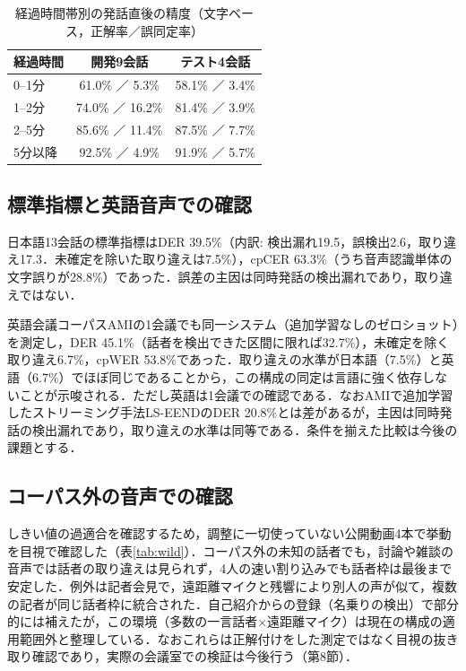 \documentclass[a4paper]{ltjsarticle}
\begin{document}
\begin{table}[tb]
\centering
\caption{経過時間帯別の発話直後の精度（文字ベース，正解率／誤同定率）}
\label{tab:band}
\small
\begin{tabular}{lcc}
\toprule
経過時間 & 開発9会話 & テスト4会話 \\
\midrule
0--1分 & 61.0\% ／ 5.3\% & 58.1\% ／ 3.4\% \\
1--2分 & 74.0\% ／ 16.2\% & 81.4\% ／ 3.9\% \\
2--5分 & 85.6\% ／ 11.4\% & 87.5\% ／ 7.7\% \\
5分以降 & 92.5\% ／ 4.9\% & 91.9\% ／ 5.7\% \\
\bottomrule
\end{tabular}
\end{table}

\subsection{標準指標と英語音声での確認}
日本語13会話の標準指標はDER 39.5\%（内訳: 検出漏れ19.5，誤検出2.6，取り違え17.3．未確定を除いた取り違えは7.5\%），cpCER 63.3\%（うち音声認識単体の文字誤りが28.8\%）であった．誤差の主因は同時発話の検出漏れであり，取り違えではない．

英語会議コーパスAMI\cite{ami}の1会議でも同一システム（追加学習なしのゼロショット）を測定し，DER 45.1\%（話者を検出できた区間に限れば32.7\%），未確定を除く取り違え6.7\%，cpWER 53.8\%であった．取り違えの水準が日本語（7.5\%）と英語（6.7\%）でほぼ同じであることから，この構成の同定は言語に強く依存しないことが示唆される．ただし英語は1会議での確認である．なおAMIで追加学習したストリーミング手法LS-EEND\cite{liang}のDER 20.8\%とは差があるが，主因は同時発話の検出漏れであり，取り違えの水準は同等である．条件を揃えた比較は今後の課題とする．

\subsection{コーパス外の音声での確認}
しきい値の過適合を確認するため，調整に一切使っていない公開動画4本で挙動を目視で確認した（表\ref{tab:wild}）．コーパス外の未知の話者でも，討論や雑談の音声では話者の取り違えは見られず，4人の速い割り込みでも話者枠は最後まで安定した．例外は記者会見で，遠距離マイクと残響により別人の声が似て，複数の記者が同じ話者枠に統合された．自己紹介からの登録（名乗りの検出）で部分的には補えたが，この環境（多数の一言話者×遠距離マイク）は現在の構成の適用範囲外と整理している．なおこれらは正解付けをした測定ではなく目視の抜き取り確認であり，実際の会議室での検証は今後行う（第8節）．
\end{document}
